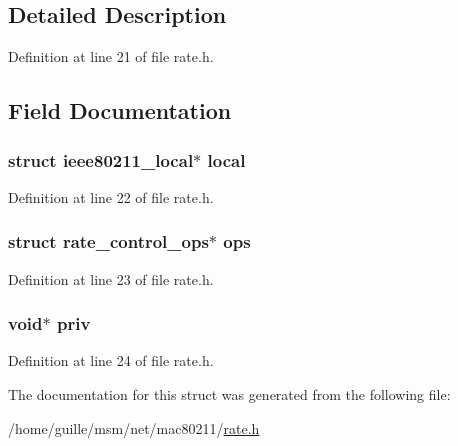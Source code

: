 \subsection{Detailed Description}


Definition at line 21 of file rate.\-h.



\subsection{Field Documentation}
\hypertarget{structrate__control__ref_ad436a024f420f219c4fe2eebce7e4ab2}{
\subsubsection[{local}]{\setlength{\rightskip}{0pt plus 5cm}struct {\bf ieee80211\-\_\-local}$\ast$ local}}\label{structrate__control__ref_ad436a024f420f219c4fe2eebce7e4ab2}


Definition at line 22 of file rate.\-h.

\hypertarget{structrate__control__ref_ab4edfb3119eea89ac8b10fb2b542f6f8}{
\subsubsection[{ops}]{\setlength{\rightskip}{0pt plus 5cm}struct rate\-\_\-control\-\_\-ops$\ast$ ops}}\label{structrate__control__ref_ab4edfb3119eea89ac8b10fb2b542f6f8}


Definition at line 23 of file rate.\-h.

\hypertarget{structrate__control__ref_a8b6505c37d4ff95854b8b00527e4d9fa}{
\subsubsection[{priv}]{\setlength{\rightskip}{0pt plus 5cm}void$\ast$ priv}}\label{structrate__control__ref_a8b6505c37d4ff95854b8b00527e4d9fa}


Definition at line 24 of file rate.\-h.



The documentation for this struct was generated from the following file\-:\begin{DoxyCompactItemize}
\item 
/home/guille/msm/net/mac80211/\hyperlink{rate_8h}{rate.\-h}\end{DoxyCompactItemize}
